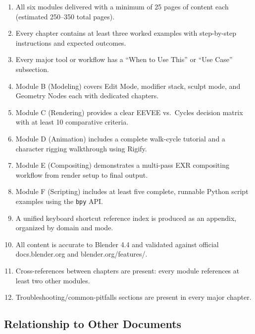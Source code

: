 \documentclass[11pt,letterpaper]{article}
\begin{document}
\begin{enumerate}[leftmargin=2em]
  \item All six modules delivered with a minimum of 25 pages of content each (estimated 250--350 total pages).
  \item Every chapter contains at least three worked examples with step-by-step instructions and expected outcomes.
  \item Every major tool or workflow has a ``When to Use This'' or ``Use Case'' subsection.
  \item Module B (Modeling) covers Edit Mode, modifier stack, sculpt mode, and Geometry Nodes each with dedicated chapters.
  \item Module C (Rendering) provides a clear EEVEE vs.\ Cycles decision matrix with at least 10 comparative criteria.
  \item Module D (Animation) includes a complete walk-cycle tutorial and a character rigging walkthrough using Rigify.
  \item Module E (Compositing) demonstrates a multi-pass EXR compositing workflow from render setup to final output.
  \item Module F (Scripting) includes at least five complete, runnable Python script examples using the \texttt{bpy} API.
  \item A unified keyboard shortcut reference index is produced as an appendix, organized by domain and mode.
  \item All content is accurate to Blender 4.4 and validated against official docs.blender.org and blender.org/features/.
  \item Cross-references between chapters are present: every module references at least two other modules.
  \item Troubleshooting/common-pitfalls sections are present in every major chapter.
\end{enumerate}

\subsection{Relationship to Other Documents}
\end{document}
